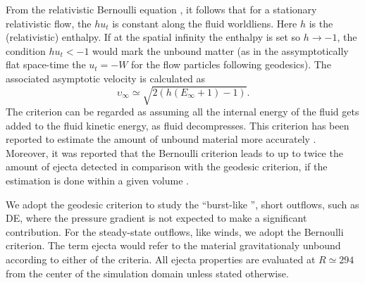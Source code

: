 From the relativistic Bernoulli equation \citep{Rezzolla:2013}, it follows
that for a stationary relativistic flow, the $hu_t$ is constant along the 
fluid worldliens. Here $h$ is the (relativistic) enthalpy. 
%
If at the spatial infinity the enthalpy is set so $h\rightarrow-1$, 
the condition $hu_t < -1$ would mark the unbound matter 
(as in the assymptotically flat space-time the 
$u_t = -W$ for the flow particles following geodesics).
%
The associated asymptotic velocity is calculated as 
%
\begin{equation}
\upsilon_{\infty} \simeq \sqrt{2 (h (E_{\infty}+1)-1)}. 
\end{equation}
%
The criterion can be regarded as assuming all the internal energy of the fluid 
gets added to the fluid kinetic energy, as fluid decompresses.
%
%
This criterion has been reported to estimate the amount of unbound material more accurately
\citep{Foucart:2015gaa}. 
Moreover, it was reported that the Bernoulli criterion leads to up to twice 
the amount of ejecta detected in comparison with the geodesic criterion, 
if the estimation is done within a given volume \citep{Kastaun:2014fna}.



We adopt the geodesic criterion to study the ``burst-like '', short outflows,
such as \ac{DE}, where the pressure gradient is not expected to make a significant contribution.
For the steady-state outflows, like \pmerg{} winds, we adopt the Bernoulli criterion.
%
The term ejecta would refer to the material gravitationaly 
unbound according to either of the criteria.
%
All ejecta properties are evaluated at $R \simeq 294$ from the center of the 
simulation domain unless stated otherwise. 



